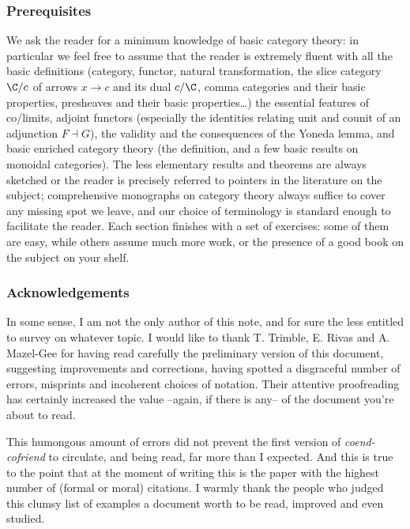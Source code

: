 \subsubsection*{\bf Prerequisites}
We ask the reader for a minimum knowledge of basic category theory: in particular we feel free to assume that the reader is extremely fluent with all the basic definitions (category, functor, natural transformation, the slice category $\C/c$ of arrows $x\to c$ and its dual $c/\C$, comma categories and their basic properties, presheaves and their basic properties\dots) the essential features of co/limits, adjoint functors (especially the identities relating unit and counit of an adjunction $F\dashv G$), the validity and the consequences of the Yoneda lemma, and basic enriched category theory (the definition, and a few basic results on monoidal categories). The less elementary results and theorems are always sketched or the reader is precisely referred to pointers in the literature on the subject; comprehensive monographs on category theory always suffice to cover any missing spot we leave, and our choice of terminology is standard enough to facilitate the reader. Each section finishes with a set of exercises: some of them are easy, while others assume much more work, or the presence of a good book on the subject on your shelf.
\subsubsection*{\bf Acknowledgements}
In some sense, I am not the only author of this note, and for sure the less entitled to survey on whatever topic. I would like to thank {\sf T\@. Trimble}, {\sf E\@. Rivas} and {\sf A\@. Mazel\hyp{}Gee} for having read carefully the preliminary version of this document, suggesting improvements and corrections, having spotted a disgraceful number of errors, misprints and incoherent choices of notation. Their attentive proofreading has certainly increased the value --again, if there is any-- of the document you're about to read.

This humongous amount of errors did not prevent the first version of \emph{coend\hyp{}cofriend} to circulate, and being read, far more than I expected. And this is true to the point that at the moment of writing this is the paper with the highest number of (formal or moral) citations. I warmly thank the people who judged this clumsy list of examples a document worth to be read, improved and even studied.


